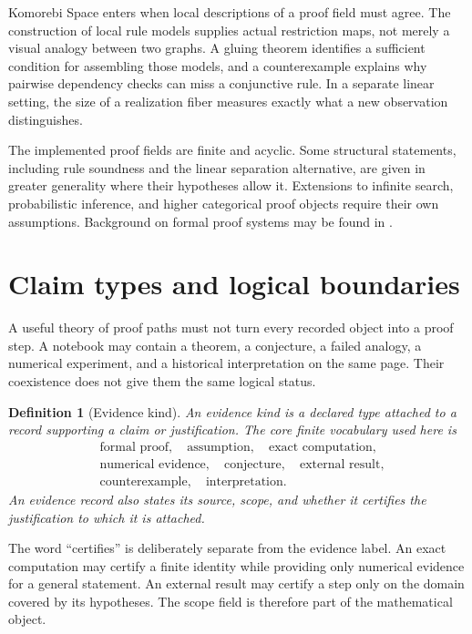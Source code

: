 \documentclass[11pt,oneside]{article}
\theoremstyle{komorebiplain}
\theoremstyle{komorebidefinition}
\newtheorem{definition}[theorem]{Definition}
\theoremstyle{komorebiremark}
\begin{document}
Komorebi Space enters when local descriptions of a proof field must agree. The construction of local rule models supplies actual restriction maps, not merely a visual analogy between two graphs. A gluing theorem identifies a sufficient condition for assembling those models, and a counterexample explains why pairwise dependency checks can miss a conjunctive rule. In a separate linear setting, the size of a realization fiber measures exactly what a new observation distinguishes.

The implemented proof fields are finite and acyclic. Some structural statements, including rule soundness and the linear separation alternative, are given in greater generality where their hypotheses allow it. Extensions to infinite search, probabilistic inference, and higher categorical proof objects require their own assumptions. Background on formal proof systems may be found in \cite{buss,troelstra}.


\section{Claim types and logical boundaries}
\label{sec:old2}

A useful theory of proof paths must not turn every recorded object into a proof step. A notebook may contain a theorem, a conjecture, a failed analogy, a numerical experiment, and a historical interpretation on the same page. Their coexistence does not give them the same logical status.

\begin{definition}[Evidence kind]
\label{res:2:1}
An evidence kind is a declared type attached to a record supporting a claim or justification. The core finite vocabulary used here is
\[
\begin{aligned}
&\text{formal proof},\quad \text{assumption},\quad \text{exact computation},\\
&\text{numerical evidence},\quad \text{conjecture},\quad \text{external result},\\
&\text{counterexample},\quad \text{interpretation}.
\end{aligned}
\]
An evidence record also states its source, scope, and whether it certifies the justification to which it is attached.
\end{definition}

The word ``certifies'' is deliberately separate from the evidence label. An exact computation may certify a finite identity while providing only numerical evidence for a general statement. An external result may certify a step only on the domain covered by its hypotheses. The scope field is therefore part of the mathematical object.
\end{document}
